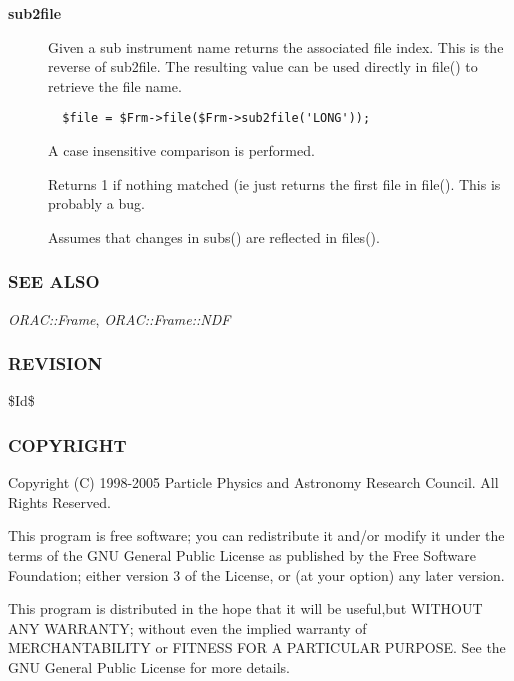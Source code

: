 \begin{description}
\item[{\textbf{sub2file}}] \mbox{}

Given a sub instrument name returns the associated file
index. This is the reverse of sub2file. The resulting value
can be used directly in file() to retrieve the file name.

\begin{verbatim}
  $file = $Frm->file($Frm->sub2file('LONG'));
\end{verbatim}


A case insensitive comparison is performed.



Returns 1 if nothing matched (ie just returns the first file
in file(). This is probably a bug.



Assumes that changes in subs() are reflected in files().

\end{description}
\subsubsection*{SEE ALSO\label{ORAC::Frame::SCUBA_SEE_ALSO}}


\emph{ORAC::Frame}, \emph{ORAC::Frame::NDF}

\subsubsection*{REVISION\label{ORAC::Frame::SCUBA_REVISION}}


\$Id\$

\subsubsection*{COPYRIGHT\label{ORAC::Frame::SCUBA_COPYRIGHT}}


Copyright (C) 1998-2005 Particle Physics and Astronomy Research
Council. All Rights Reserved.



This program is free software; you can redistribute it and/or modify it under
the terms of the GNU General Public License as published by the Free Software
Foundation; either version 3 of the License, or (at your option) any later
version.



This program is distributed in the hope that it will be useful,but WITHOUT ANY
WARRANTY; without even the implied warranty of MERCHANTABILITY or FITNESS FOR A
PARTICULAR PURPOSE. See the GNU General Public License for more details.



